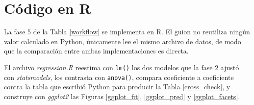 \section{Código en R}
    \label{anexo_r}
    La fase 5 de la Tabla \ref{workflow} se implementa en R. El guion no reutiliza
    ningún valor calculado en Python, únicamente lee el mismo archivo de datos, de
    modo que la comparación entre ambas implementaciones es directa.

    \vspace{10pt}

    El archivo \textit{regression.R} reestima con \texttt{lm()} los dos modelos 
    que la fase 2 ajustó con \textit{statsmodels}, los contrasta con \texttt{anova()}, 
    compara coeficiente a coeficiente contra la tabla que escribió Python para 
    producir la Tabla \ref{cross_check}, y construye con \textit{ggplot2} 
    las Figuras \ref{ggplot_fit}, \ref{ggplot_pred} y \ref{ggplot_facets}.

    \vspace{10pt}

    

